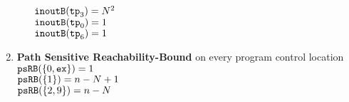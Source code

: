 \begin{enumerate}
\begin{itemize}
    $\mathtt{inoutB}(\mathtt{tp}_3) = N^2$ \\
    $\mathtt{inoutB}(\mathtt{tp}_0) = 1$ \\
    $\mathtt{inoutB}(\mathtt{tp}_6) = 1$ 
\end{itemize}
\item \textbf{Path Sensitive Reachability-Bound} on every program control location
\\
$\mathtt{psRB}(\{0, \mathtt{ex}\}) = 1$ \\
$\mathtt{psRB}(\{1\}) = n - N + 1$ \\
$\mathtt{psRB}(\{2, 9\}) = n - N$ \\
\end{enumerate}